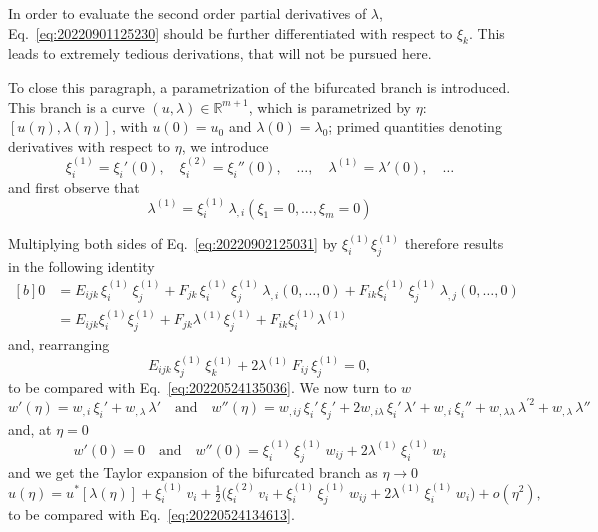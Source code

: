 \documentclass[12pt, final]{scrartcl}
\theoremstyle{definition}
\newcommand{\order}[2][1]{#2^{(#1)}}
\newcommand{\reals}{\mathbb{R}}
\begin{document}
In order to evaluate the second order partial derivatives of $\lambda$, Eq.~\eqref{eq:20220901125230} should be further
differentiated with respect to $\xi_k$. This leads to extremely tedious derivations, that will not be pursued here.

To close this paragraph, a parametrization of the bifurcated branch is introduced. This branch is a curve
$(u, \lambda) \in \reals ^ {m + 1}$, which is parametrized by $\eta$: $[u(\eta), \lambda(\eta)]$, with $u(0) = u_0$ and
$\lambda(0) = \lambda_0$; primed quantities denoting derivatives with respect to $\eta$, we introduce
\begin{equation}
  \order[1]{\xi_i} = \xi_i'(0), \quad
  \order[2]{\xi_i} = \xi_i''(0), \quad \ldots, \quad
  \order[1]{\lambda} = \lambda'(0), \quad \ldots
\end{equation}
and first observe that
\begin{equation}
  \order[1]{\lambda} = \order[1]{\xi_i} \, \lambda_{,i}(\xi_1 = 0, \ldots, \xi_ m = 0)
\end{equation}

Multiplying both sides of Eq.~\eqref{eq:20220902125031} by $\order[1]{\xi_i} \order[1]{\xi_j}$ therefore results in the
following identity
\begin{equation}
  \begin{aligned}[b]
    0 &= E_{ijk} \, \order[1]{\xi_i} \, \order[1]{\xi_j} +  F_{jk} \, \order[1]{\xi_i} \, \order[1]{\xi_j} \, \lambda_{, i}(0, \ldots, 0) + F_{ik} \order[1]{\xi_i} \, \order[1]{\xi_j} \, \lambda_{, j}(0, \ldots, 0)\\
    &= E_{ijk} \order[1]{\xi_i} \order[1]{\xi_j} +  F_{jk} \order[1]{\lambda} \order[1]{\xi_j} + F_{ik} \order[1]{\xi_i} \order[1]{\lambda}
  \end{aligned}
\end{equation}
and, rearranging
\begin{equation}
  E_{ijk} \, \order[1]{\xi_j} \, \order[1]{\xi_k} +  2 \order[1]{\lambda} \, F_{ij}  \, \order[1]{\xi_j} = 0,
\end{equation}
to be compared with Eq.~\eqref{eq:20220524135036}. We now turn to $w$
\begin{equation}
  w'(\eta) = w_{,i} \, \xi_i' + w_{,\lambda} \, \lambda'
  \quad \text{and} \quad
  w''(\eta) = w_{,ij} \, \xi_i' \, \xi_j' + 2w_{,i\lambda} \, \xi_i' \, \lambda' + w_{,i} \, \xi_i'' + w_{,\lambda\lambda} \, \lambda^{'2} + w_{,\lambda} \, \lambda''
\end{equation}
and, at $\eta = 0$
\begin{equation}
  w'(0) = 0 \quad \text{and} \quad w''(0) = \order[1]{\xi_i} \, \order[1]{\xi_j} \, w_{ij}  + 2 \order[1]{\lambda} \, \order[1]{\xi_i} \, w_i
\end{equation}
and we get the Taylor expansion of the bifurcated branch as $\eta \to 0$
\begin{equation}
  u(\eta) = u^\ast[\lambda(\eta)] + \order[1]{\xi_i} \, v_i + \tfrac{1}{2} \bigl( \order[2]{\xi_i} \, v_i + \order[1]{\xi_i} \, \order[1]{\xi_j} \, w_{ij}  + 2\order[1]{\lambda} \, \order[1]{\xi_i} \, w_i\bigr) + o(\eta^2),
\end{equation}
to be compared with Eq.~\eqref{eq:20220524134613}.
\end{document}
